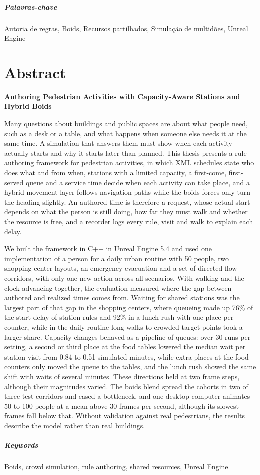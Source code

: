 \paragraph{Palavras-chave} Autoria de regras, Boids, Recursos partilhados, Simulação de multidões, Unreal Engine

\cleardoublepage

\chapter*{Abstract}

\noindent\textbf{Authoring Pedestrian Activities with Capacity-Aware Stations and Hybrid Boids}

Many questions about buildings and public spaces are about what people need, such as a desk or a table, and what happens when someone else needs it at the same time. A simulation that answers them must show when each activity actually starts and why it starts later than planned. This thesis presents a rule-authoring framework for pedestrian activities, in which XML schedules state who does what and from when, stations with a limited capacity, a first-come, first-served queue and a service time decide when each activity can take place, and a hybrid movement layer follows navigation paths while the boids forces only turn the heading slightly. An authored time is therefore a request, whose actual start depends on what the person is still doing, how far they must walk and whether the resource is free, and a recorder logs every rule, visit and walk to explain each delay.

We built the framework in C++ in Unreal Engine 5.4 and used one implementation of a person for a daily urban routine with 50 people, two shopping center layouts, an emergency evacuation and a set of directed-flow corridors, with only one new action across all scenarios. With walking and the clock advancing together, the evaluation measured where the gap between authored and realized times comes from. Waiting for shared stations was the largest part of that gap in the shopping centers, where queueing made up 76\% of the start delay of station rules and 92\% in a lunch rush with one place per counter, while in the daily routine long walks to crowded target points took a larger share. Capacity changes behaved as a pipeline of queues: over 30 runs per setting, a second or third place at the food tables lowered the median wait per station visit from 0.84 to 0.51 simulated minutes, while extra places at the food counters only moved the queue to the tables, and the lunch rush showed the same shift with waits of several minutes. These directions held at two frame steps, although their magnitudes varied. The boids blend spread the cohorts in two of three test corridors and eased a bottleneck, and one desktop computer animates 50 to 100 people at a mean above 30 frames per second, although its slowest frames fall below that. Without validation against real pedestrians, the results describe the model rather than real buildings.

\paragraph{Keywords} Boids, crowd simulation, rule authoring, shared resources, Unreal Engine

\cleardoublepage

